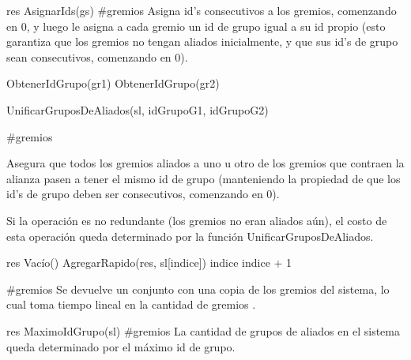 {
	\state res \asig AsignarIds(gs)								
}
{\#gremios}
{Asigna id's consecutivos a los gremios, comenzando en 0, y luego le asigna a cada gremio un id de grupo igual a su id propio (esto garantiza que los gremios no tengan aliados inicialmente, y que sus id's de grupo sean consecutivos, comenzando en 0). }

{
	\state {} \asig ObtenerIdGrupo(gr1)						
	\state {} \asig ObtenerIdGrupo(gr2)						
	\state 

													
		\state UnificarGruposDeAliados(sl, idGrupoG1, idGrupoG2)					
	\endif
}
{\#gremios}
{ Asegura que todos los gremios aliados a uno u otro de los gremios que contraen la alianza pasen a tener el mismo id de grupo (manteniendo la propiedad de que los id's de grupo deben ser consecutivos, comenzando en 0).

\hspace{10pt} Si la operaci\'on es no redundante (los gremios no eran aliados a\'un), el costo de esta operaci\'on queda determinado por la funci\'on UnificarGruposDeAliados. }

{
	\state res \asig Vac\'io() 
	\state {} 
	\state 	
		\state 
		\state AgregarRapido(res, sl[indice])
		\state
		\state indice \asig indice + 1
	\endwhile

}
{\#gremios}
{ Se devuelve un conjunto con una copia de los gremios del sistema, lo cual toma tiempo lineal en la cantidad de gremios . }

{
	\state res \asig MaximoIdGrupo(sl)						
}
{\#gremios}
{La cantidad de grupos de aliados en el sistema queda determinado por el m\'aximo id de grupo.}

